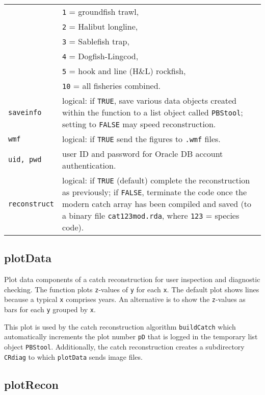 \documentclass[letterpaper,12pt,fleqn]{article}
\def\tab{\hspace{0.5 in}}
\newcommand{\code}[1]{\small\texttt{#1}\normalsize}
\begin{document}
\begin{longtable}[1]{l>{\raggedright\arraybackslash}p{} }
                &  \code{1}  = groundfish trawl,\\
                &  \code{2}  = Halibut longline,\\
                &  \code{3}  = Sablefish trap,\\
                &  \code{4}  = Dogfish-Lingcod,\\
                &  \code{5}  = hook and line (H\&L) rockfish,\\
                &  \code{10} = all fisheries combined.\\
  \code{saveinfo}     &  logical: if \code{TRUE}, save various data objects created within the function to a list object called \code{PBStool}; setting to \code{FALSE} may speed reconstruction.\\
  \code{wmf}          &  logical: if \code{TRUE} send the figures to \code{.wmf} files.\\
  \code{uid, pwd}     &  user ID and password for Oracle DB account authentication.\\
  \code{reconstruct}  &  logical: if \code{TRUE} (default) complete the reconstruction as previously; if \code{FALSE}, terminate the code once the modern catch array has been compiled and saved (to a binary file \code{cat123mod.rda}, where \code{123} = species code).\\
\end{longtable}

\subsection {plotData}

\tab Plot data components of a catch reconstruction for user inspection and diagnostic checking. The function plots \code{z}-values of \code{y} for each \code{x}. The default plot shows lines because a typical \code{x} comprises years. An alternative is to show the \code{z}-values as bars for each \code{y} grouped by \code{x}.

\tab This plot is used by the catch reconstruction algorithm \code{buildCatch} which automatically increments the plot number \code{pD} that is logged in the temporary list object \code{PBStool}. Additionally, the catch reconstruction creates a subdirectory \code{CRdiag} to which \code{plotData} sends image files.

\subsection {plotRecon}
\end{document}
